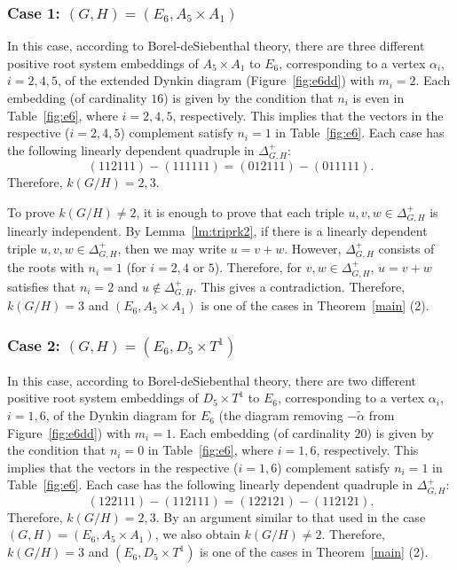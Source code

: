 \documentclass{amsart}
\theoremstyle{definition}
\theoremstyle{remark}
\numberwithin{equation}{section}
\begin{document}
\subsubsection{Case 1: $(G,H)=(E_{6},A_{5}\times A_{1})$}
\label{sect:9.1.1}
In this case, according to Borel-deSiebenthal theory,
there are three different positive root system embeddings of $A_{5}\times A_{1}$ to $E_{6}$, corresponding to a vertex $\alpha_{i}$, $i=2,4,5$, of the extended Dynkin diagram (Figure~\ref{fig:e6dd}) with $m_{i}=2$.
Each embedding (of cardinality $16$) is given by the condition that $n_{i}$ is even in Table~\ref{fig:e6}, where $i=2,4,5$, respectively.
This implies that the vectors in the respective ($i=2,4,5$) complement satisfy $n_{i}=1$ in Table~\ref{fig:e6}.
Each case has the following linearly dependent quadruple in $\Delta^{+}_{G,H}$:
\[
(112111)-(111111)=(012111)-(011111).
\]
Therefore, $k(G/H)=2,3$.
 
To prove $k(G/H)\not=2$, it is enough to prove that each triple $u,v,w\in \Delta^{+}_{G,H}$ is linearly independent.
By Lemma~\ref{lm:triprk2},
if there is a linearly dependent triple $u,v,w\in \Delta^{+}_{G,H}$, then we may write $u=v+w$.
However, $\Delta^{+}_{G,H}$ consists of the roots with $n_{i}=1$ (for $i=2,4$ or $5$).
Therefore, for $v,w\in \Delta^{+}_{G,H}$, $u=v+w$ satisfies that $n_{i}=2$ and $u\not\in \Delta^{+}_{G,H}$.
This gives a contradiction.
Therefore, $k(G/H)=3$ and $(E_{6},A_{5}\times A_{1})$ is one of the cases in Theorem~\ref{main} (2).

\subsubsection{Case 2: $(G,H)=(E_{6},D_{5}\times T^{1})$}
\label{sect:9.1.2}
In this case, according to Borel-deSiebenthal theory,
there are two different positive root system embeddings of $D_{5}\times T^{1}$ to $E_{6}$, corresponding to a vertex $\alpha_{i}$, $i=1,6$, of the Dynkin diagram for $E_{6}$ (the diagram removing $-\widetilde{\alpha}$ from Figure~\ref{fig:e6dd}) with $m_{i}=1$.
Each embedding (of cardinality $20$) is given by the condition that $n_{i}=0$ in Table~\ref{fig:e6}, where $i=1,6$, respectively.
This implies that the vectors in the respective ($i=1,6$) complement satisfy $n_{i}=1$ in Table~\ref{fig:e6}.
Each case has the following linearly dependent quadruple in $\Delta^{+}_{G,H}$:
\[
(122111)-(112111)=(122121)-(112121).
\]
Therefore, $k(G/H)=2,3$.
By an argument similar to that used in the case $(G,H)=(E_{6},A_{5}\times A_{1})$, we also obtain $k(G/H)\not=2$.
Therefore, $k(G/H)=3$ and $(E_{6},D_{5}\times T^{1})$ is one of the cases in Theorem~\ref{main} (2).
\end{document}
